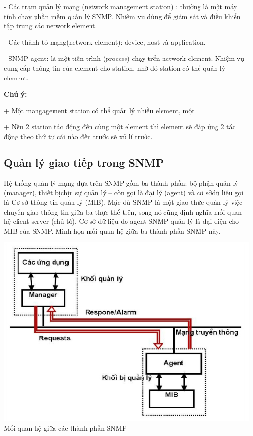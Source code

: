 \documentclass[12pt,oneside,a4paper,reqno]{report}
\begin{document}
\begin{large}
- Các trạm quản lý mạng (network management station) : thường là một máy tính chạy phần mềm quản lý SNMP. Nhiệm vụ dùng để giám sát và điều khiển tập trung các network element.

- Các thành tố mạng(network element): device, host và application.

- SNMP agent: là một tiến trình (process) chạy trển network element. Nhiệm vụ cung cấp thông tin của element cho station, nhờ đó station có thể quản lý element.

{\bf Chú ý:} 

+ Một mangagement station có thể quản lý nhiều element, một 

+ Nếu 2 station tác động đến cùng một element thì element sẽ đáp ứng 2 tác động theo thứ tự cái nào đến trước sẽ xử lí trước.

\subsection{Quản lý giao tiếp trong SNMP}

Hệ thống quản lý mạng dựa trên SNMP gồm ba thành phần: bộ phận quản lý (manager), thiết bịchịu sự quản lý – còn gọi là đại lý (agent) và cơ sởdữ liệu gọi là Cơ sở thông tin quản lý (MIB). Mặc dù SNMP là một giao thức quản lý việc chuyển giao thông tin giữa ba thực thể trên, song nó cũng định nghĩa mối quan hệ client-server (chủ tớ). Cơ sở dữ liệu do agent SNMP quản lý là đại diện cho MIB của SNMP. Minh họa mối quan hệ giữa ba thành phần SNMP này.

\begin{center}
	\includegraphics[scale=0.8]{images/giaotiepsnmp.jpg}\\
	Mối quan hệ giữa các thành phần SNMP
\end{center}


\end{large}
\end{document}
